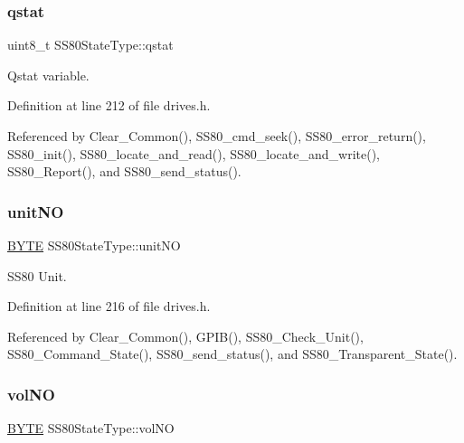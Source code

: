\subsubsection{\texorpdfstring{qstat}{qstat}}
{\footnotesize\ttfamily uint8\+\_\+t S\+S80\+State\+Type\+::qstat}



Qstat variable. 



Definition at line 212 of file drives.\+h.



Referenced by Clear\+\_\+\+Common(), S\+S80\+\_\+cmd\+\_\+seek(), S\+S80\+\_\+error\+\_\+return(), S\+S80\+\_\+init(), S\+S80\+\_\+locate\+\_\+and\+\_\+read(), S\+S80\+\_\+locate\+\_\+and\+\_\+write(), S\+S80\+\_\+\+Report(), and S\+S80\+\_\+send\+\_\+status().

\mbox{\label{structSS80StateType_ad2b3cd5353f5650df931520a39b385e7}} 
\subsubsection{\texorpdfstring{unit\+NO}{unitNO}}
{\footnotesize\ttfamily \hyperlink{integer_8h_a4ae1dab0fb4b072a66584546209e7d58}{B\+Y\+TE} S\+S80\+State\+Type\+::unit\+NO}



S\+S80 Unit. 



Definition at line 216 of file drives.\+h.



Referenced by Clear\+\_\+\+Common(), G\+P\+I\+B(), S\+S80\+\_\+\+Check\+\_\+\+Unit(), S\+S80\+\_\+\+Command\+\_\+\+State(), S\+S80\+\_\+send\+\_\+status(), and S\+S80\+\_\+\+Transparent\+\_\+\+State().

\mbox{\label{structSS80StateType_ac197866db7677ec4bf9ad5e29e4a58a3}} 
\subsubsection{\texorpdfstring{vol\+NO}{volNO}}
{\footnotesize\ttfamily \hyperlink{integer_8h_a4ae1dab0fb4b072a66584546209e7d58}{B\+Y\+TE} S\+S80\+State\+Type\+::vol\+NO}



